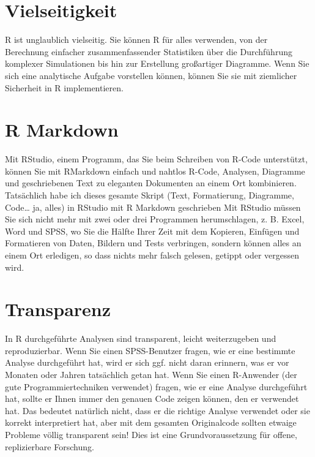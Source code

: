 \documentclass[
]{book}
\begin{document}
\hypertarget{vielseitigkeit}{%
\section{Vielseitigkeit}\label{vielseitigkeit}}

R ist unglaublich vielseitig. Sie können R für alles verwenden, von der Berechnung einfacher zusammenfassender Statistiken über die Durchführung komplexer Simulationen bis hin zur Erstellung großartiger Diagramme. Wenn Sie sich eine analytische Aufgabe vorstellen können, können Sie sie mit ziemlicher Sicherheit in R implementieren.

\hypertarget{r-markdown}{%
\section{R Markdown}\label{r-markdown}}

Mit RStudio, einem Programm, das Sie beim Schreiben von R-Code unterstützt, können Sie mit RMarkdown einfach und nahtlos R-Code, Analysen, Diagramme und geschriebenen Text zu eleganten Dokumenten an einem Ort kombinieren. Tatsächlich habe ich dieses gesamte Skript (Text, Formatierung, Diagramme, Code\ldots{} ja, alles) in RStudio mit R Markdown geschrieben Mit RStudio müssen Sie sich nicht mehr mit zwei oder drei Programmen herumschlagen, z. B. Excel, Word und SPSS, wo Sie die Hälfte Ihrer Zeit mit dem Kopieren, Einfügen und Formatieren von Daten, Bildern und Tests verbringen, sondern können alles an einem Ort erledigen, so dass nichts mehr falsch gelesen, getippt oder vergessen wird.

\hypertarget{transparenz}{%
\section{Transparenz}\label{transparenz}}

In R durchgeführte Analysen sind transparent, leicht weiterzugeben und reproduzierbar. Wenn Sie einen SPSS-Benutzer fragen, wie er eine bestimmte Analyse durchgeführt hat, wird er sich ggf. nicht daran erinnern, was er vor Monaten oder Jahren tatsächlich getan hat. Wenn Sie einen R-Anwender (der gute Programmiertechniken verwendet) fragen, wie er eine Analyse durchgeführt hat, sollte er Ihnen immer den genauen Code zeigen können, den er verwendet hat. Das bedeutet natürlich nicht, dass er die richtige Analyse verwendet oder sie korrekt interpretiert hat, aber mit dem gesamten Originalcode sollten etwaige Probleme völlig transparent sein! Dies ist eine Grundvoraussetzung für offene, replizierbare Forschung.
\end{document}

